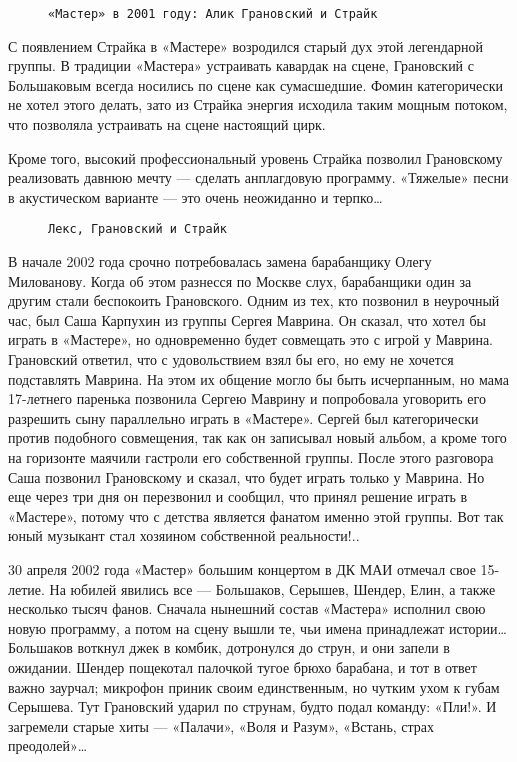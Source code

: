 \begin{figure}[h]
    \centering
    \caption{\texttt{«Мастер» в 2001 году: Алик Грановский и Страйк}}
\end{figure}

С появлением Страйка в «Мастере» возродился старый дух этой легендарной группы. В традиции «Мастера» устраивать кавардак
на сцене, Грановский с Большаковым всегда носились по сцене как сумасшедшие. Фомин категорически не хотел этого делать,
зато из Страйка энергия исходила таким мощным потоком, что позволяла устраивать на сцене настоящий цирк.

Кроме того, высокий профессиональный уровень Страйка позволил Грановскому реализовать давнюю мечту — сделать анплагдовую
программу. «Тяжелые» песни в акустическом варианте — это очень неожиданно и терпко\ldots

\begin{figure}[h]
    \centering
    \caption{\texttt{Лекс, Грановский и Страйк}}
\end{figure}

В начале 2002 года срочно потребовалась замена барабанщику Олегу Милованову. Когда об этом разнесся по Москве слух,
барабанщики один за другим стали беспокоить Грановского. Одним из тех, кто позвонил в неурочный час, был Саша Карпухин
из группы Сергея Маврина. Он сказал, что хотел бы играть в «Мастере», но одновременно будет совмещать это с игрой у
Маврина. Грановский ответил, что с удовольствием взял бы его, но ему не хочется подставлять Маврина. На этом их общение
могло бы быть исчерпанным, но мама 17-летнего паренька позвонила Сергею Маврину и попробовала уговорить его разрешить
сыну параллельно играть в «Мастере». Сергей был категорически против подобного совмещения, так как он записывал новый
альбом, а кроме того на горизонте маячили гастроли его собственной группы. После этого разговора Саша позвонил
Грановскому и сказал, что будет играть только у Маврина. Но еще через три дня он перезвонил и сообщил, что принял
решение играть в «Мастере», потому что с детства является фанатом именно этой группы. Вот так юный музыкант стал
хозяином собственной реальности!..

30 апреля 2002 года «Мастер» большим концертом в ДК МАИ отмечал свое 15-летие. На юбилей явились все — Большаков,
Серышев, Шендер, Елин, а также несколько тысяч фанов. Сначала нынешний состав «Мастера» исполнил свою новую программу, а
потом на сцену вышли те, чьи имена принадлежат истории\ldots Большаков воткнул джек в комбик, дотронулся до струн, и они
запели в ожидании. Шендер пощекотал палочкой тугое брюхо барабана, и тот в ответ важно заурчал; микрофон приник своим
единственным, но чутким ухом к губам Серышева. Тут Грановский ударил по струнам, будто подал команду: «Пли!». И
загремели старые хиты — «Палачи», «Воля и Разум», «Встань, страх преодолей»\ldots

